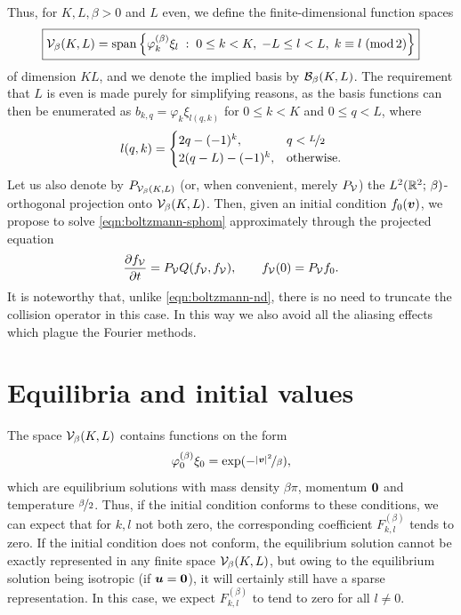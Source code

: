 Thus, for $K,L,\beta>0$ and $L$ even, we define the finite-dimensional function spaces
\[ \boxed{
    \mathcal{V}_\beta(K,L) = \operatorname{span} \left\{ \varphi^{(\beta)}_k\xi_l \;:\; 0\leq k < K, \; -L \leq l < L, \;
    k \equiv l \;(\operatorname{mod} 2) \right\}
} \]
of dimension $KL$, and we denote the implied basis by $\mathcal{B}_\beta(K,L)$. The requirement that $L$ is even is
made purely for simplifying reasons, as the basis functions can then be enumerated as $b_{k,q} = \varphi_k
\xi_{l(q,k)}$ for $0 \leq k < K$ and $0 \leq q < L$, where
\begin{equation} \label{eqn:pol-enum}
    l(q,k) = \begin{cases} 2q - (-1)^k,& q < \nicefrac{L}{2} \\
                           2(q-L) - (-1)^k,& \text{otherwise}.
             \end{cases}
\end{equation}
Let us also denote by $P_{\mathcal{V}_\beta(K,L)}$ (or, when convenient, merely $P_{\mathcal{V}}$) the
$L^2(\mathbb{R}^2;\,\beta)$-orthogonal projection onto $\mathcal{V}_\beta(K,L)$. Then, given an initial condition
$f_0({\bm v})$, we propose to solve \eqref{eqn:boltzmann-sphom} approximately through the projected equation
\[
    \frac{\partial f_{\mathcal{V}}}{\partial t} = P_{\mathcal{V}} Q(f_{\mathcal{V}},f_{\mathcal{V}}), \qquad
    f_{\mathcal{V}}(0) = P_{\mathcal{V}} f_0.
\]
It is noteworthy that, unlike \eqref{eqn:boltzmann-nd}, there is no need to truncate the collision operator in
this case. In this way we also avoid all the aliasing effects which plague the Fourier methods.

\section{Equilibria and initial values}
\label{sec:polar-equilibria}

The space $\mathcal{V}_\beta(K,L)$ contains functions on the form 
\[
    \varphi^{(\beta)}_0\xi_0 = \exp(-\nicefrac{|{\bm v}|^2}{\beta}),
\]
which are equilibrium solutions with mass density $\beta\pi$, momentum ${\bm0}$ and temperature
$\nicefrac{\beta}{2}$. Thus, if the initial condition conforms to these conditions, we can expect that for
$k,l$ not both zero, the corresponding coefficient $F^{(\beta)}_{k,l}$ tends to zero.  If the initial
condition does not conform, the equilibrium solution cannot be exactly represented in any finite space
$\mathcal{V}_\beta(K,L)$, but owing to the equilibrium solution being isotropic (if ${\bm u}={\bm0}$), it will certainly
still have a sparse representation. In this case, we expect $F^{(\beta)}_{k,l}$ to tend to zero for all
$l\neq0$.

